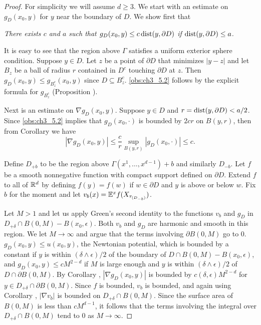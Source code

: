 \begin{proof}
For simplicity we will assume $d \geq 3$. We start with an estimate on $g_D(x_0,y)$ for $y$ near the boundary of $D$. We show first that
\begin{obs}\label{obs:ch3_5.2}
    \textit{There exists $c$ and $a$ such that $g_D(x_0,y) \leq c\operatorname{dist}(y,\partial D)$ if $\operatorname{dist}(y,\partial D) \allowbreak \leq a$.}
\end{obs}

It is easy to see that the region above $\Gamma$ satisfies a uniform exterior sphere condition. Suppose $y \in D$. Let $z$ be a point of $\partial D$ that minimizes $|y - z|$ and let $B_z$ be a ball of radius $r$ contained in $D^c$ touching $\partial D$ at $z$. Then $g_D(x_0,y) \leq g_{B_z^c}(x_0,y)$ since $D \subseteq B_z^c$. \eqref{obs:ch3_5.2} follows by the explicit formula for $g_{B_z^c}$ (Proposition ).

Next is an estimate on $\nabla g_D(x_0,y)$. Suppose $y \in D$ and $r = \operatorname{dist}(y,\partial D) \allowbreak < a/2$. Since \eqref{obs:ch3_5.2} implies that $g_D(x_0,\cdot)$ is bounded by $2cr$ on $B(y,r)$, then from Corollary  we have
\begin{equation}\label{eq:ch3_5.3}
    |\nabla g_D(x_0,y)| \leq \frac{c}{r} \sup_{B(y,r)} |g_D(x_0,\cdot)| \leq c.
\end{equation}

Define $D_{+b}$ to be the region above $\Gamma(x^1,\ldots,x^{d-1}) + b$ and similarly $D_{-b}$. Let $f$ be a smooth nonnegative function with compact support defined on $\partial D$. Extend $f$ to all of $\mathbb{R}^d$ by defining $f(y) = f(w)$ if $w \in \partial D$ and $y$ is above or below $w$. Fix $b$ for the moment and let $v_b(x) = \mathbb{E}^xf(X_{\tau_{(D_{-b})}})$.

Let $M > 1$ and let us apply Green's second identity to the functions $v_b$ and $g_D$ in $D_{+\delta} \cap B(0,M) - B(x_0,\epsilon)$. Both $v_b$ and $g_D$ are harmonic and smooth in this region. We let $M \to \infty$ and argue that the terms involving $\partial B(0,M)$ go to $0$. $g_D(x_0,y) \leq u(x_0,y)$, the Newtonian potential, which is bounded by a constant if $y$ is within $(\delta \wedge \epsilon)/2$ of the boundary of $D \cap B(0,M) - B(x_0,\epsilon)$, and $g_D(x_0,y) \leq cM^{2-d}$ if $M$ is large enough and $y$ is within $(\delta \wedge \epsilon)/2$ of $D \cap \partial B(0,M)$. By Corollary , $|\nabla g_D(x_0,y)|$ is bounded by $c(\delta,\epsilon)M^{2-d}$ for $y \in D_{+\delta} \cap \partial B(0,M)$. Since $f$ is bounded, $v_b$ is bounded, and again using Corollary , $|\nabla v_b|$ is bounded on $D_{+\delta} \cap B(0,M)$. Since the surface area of $B(0,M)$ is less than $cM^{d-1}$, it follows that the terms involving the integral over $D_{+\delta} \cap B(0,M)$ tend to $0$ as $M \to \infty$.


\end{proof}
